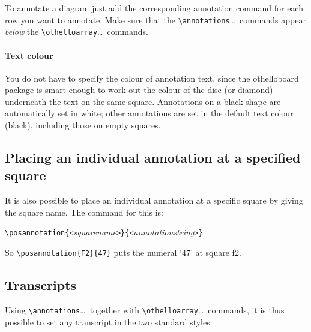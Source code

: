 \documentclass[a4paper,12pt]{article}
\begin{document}
To annotate a diagram just add the corresponding annotation command for each row you want to annotate. Make sure that the \verb=\annotations=\ldots\ commands appear \emph{below} the \verb=\othelloarray=\ldots\ commands.

\paragraph{Text colour}
You do not have to specify the colour of annotation text, since the \textsf{othelloboard} package is smart enough to work out the colour of the disc (or diamond) underneath the text on the same square. Annotations on a black shape are automatically set in white; other annotations are set in the default text colour (black), including those on empty squares.

\subsection{Placing an individual annotation at a specified square}

It is also possible to place an individual annotation at a specific square by giving the square name. The command for this is:

\verb=\posannotation{<=\emph{squarename}\verb=>}{<=\emph{annotationstring}\verb=>}=

So \verb=\posannotation{F2}{47}= puts the numeral `47' at square f2. 


\subsection{Transcripts}
Using \verb=\annotations=\ldots\ together with \verb=\othelloarray=\ldots\ commands, it is thus possible to set any transcript in the two standard styles: \\
\end{document}
